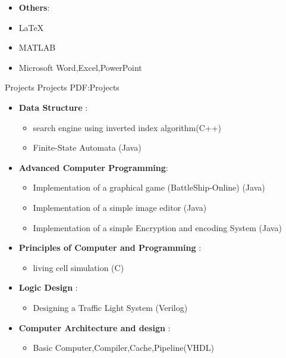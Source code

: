 \documentclass[letterpaper,MMMyyyy,nonstopmode]{simpleresumecv}
\begin{document}
\begin{Body}
\begin{itemize}
 \item \textbf{Others}: 
\item{\LaTeX}
\item MATLAB
\item Microsoft Word,Excel,PowerPoint

\end{itemize}







\Section
{Projects}
{Projects}
{PDF:Projects}

\Entry
\begin{itemize}
	\item \textbf{Data Structure} :
		\begin{itemize}
		\item	search engine using inverted index algorithm(C++)
	     \item   Finite-State Automata (Java)
		\end{itemize}
		
	\item \textbf{Advanced Computer Programming}:
		\begin{itemize}
		\item  Implementation of a graphical game (BattleShip-Online) (Java)
     	\item Implementation of a simple image editor (Java)
	    \item Implementation of a simple Encryption and encoding System  (Java)
		\end{itemize}
		
	\item \textbf{Principles of Computer and Programming }: 
		\begin{itemize}
	    \item  living cell simulation (C)
	      	\end{itemize}
   	\item \textbf{Logic Design} : 
   		\begin{itemize}
     \item	Designing a Traffic Light System (Verilog)
     		\end{itemize}
   	\item \textbf{Computer Architecture and design} :
   		\begin{itemize}
		\item Basic Computer,Compiler,Cache,Pipeline(VHDL)
		\end{itemize}
		

\end{itemize}
\end{Body}
\end{document}
